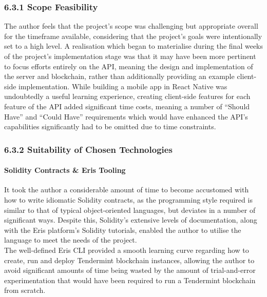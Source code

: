 \documentclass[12pt]{report}
\let\oldparagraph\paragraph
\renewcommand{\paragraph}[1]{\oldparagraph{#1}\mbox{}}
\begin{document}
\subsubsection{6.3.1 Scope Feasibility}\label{scope-feasibility}

The author feels that the project's scope was challenging but
appropriate overall for the timeframe available, considering that the
project's goals were intentionally set to a high level. A realisation
which began to materialise during the final weeks of the project's
implementation stage was that it may have been more pertinent to focus
efforts entirely on the API, meaning the design and implementation of
the server and blockchain, rather than additionally providing an example
client-side implementation. While building a mobile app in React Native
was undoubtedly a useful learning experience, creating client-side
features for each feature of the API added significant time costs,
meaning a number of ``Should Have'' and ``Could Have'' requirements
which would have enhanced the API's capabilities significantly had to be
omitted due to time constraints.

\subsubsection{6.3.2 Suitability of Chosen
Technologies}\label{suitability-of-chosen-technologies}

\paragraph{Solidity Contracts \& Eris
Tooling}\label{solidity-contracts-eris-tooling}

It took the author a considerable amount of time to become accustomed
with how to write idiomatic Solidity contracts, as the programming style
required is similar to that of typical object-oriented languages, but
deviates in a number of significant ways. Despite this, Solidity's
extensive levels of documentation, along with the Eris platform's
Solidity tutorials, enabled the author to utilise the language to meet
the needs of the project.\\
The well-defined Eris CLI provided a smooth learning curve regarding how
to create, run and deploy Tendermint blockchain instances, allowing the
author to avoid significant amounts of time being wasted by the amount
of trial-and-error experimentation that would have been required to run
a Tendermint blockchain from scratch.
\end{document}
